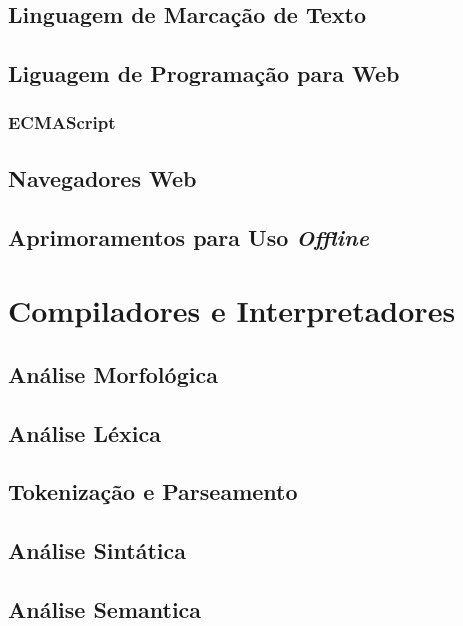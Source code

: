 \subsection{Linguagem de Marcação de Texto}

\subsection{Liguagem de Programação para Web}

\subsubsection{ECMAScript}

\subsection{Navegadores Web}

\subsection{Aprimoramentos para Uso \textit{Offline}}

\section{Compiladores e Interpretadores}

\subsection{Análise Morfológica}

\subsection{Análise Léxica}

\subsection{Tokenização e Parseamento}

\subsection{Análise Sintática}

\subsection{Análise Semantica}
